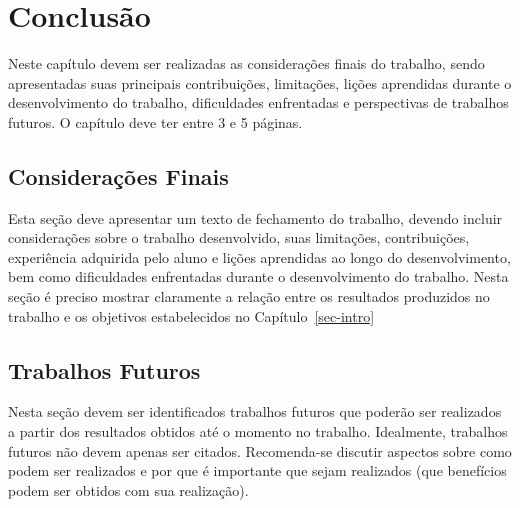 \chapter{Conclusão}
\label{sec-conclusoes}

Neste capítulo devem ser realizadas as considerações finais do trabalho, sendo apresentadas suas principais contribuições, limitações, lições aprendidas durante o desenvolvimento do trabalho, dificuldades enfrentadas e perspectivas de trabalhos futuros. O capítulo deve ter entre 3 e 5 páginas.


\section{Considerações Finais}
\label{sec-conclusoes-consideracoes}

Esta seção deve apresentar um texto de fechamento do trabalho, devendo incluir considerações sobre o trabalho desenvolvido, suas limitações, contribuições, experiência adquirida pelo aluno e lições aprendidas ao longo do desenvolvimento, bem como dificuldades enfrentadas durante o desenvolvimento do trabalho. Nesta seção é preciso mostrar claramente a relação entre os resultados produzidos no trabalho e os objetivos estabelecidos no Capítulo~\ref{sec-intro} 


\section{Trabalhos Futuros}
\label{sec-conclusoes-trabalhosfuturos}

Nesta seção devem ser identificados trabalhos futuros que poderão ser realizados a partir dos resultados obtidos até o momento no trabalho. Idealmente, trabalhos futuros não devem apenas ser citados. Recomenda-se discutir aspectos sobre como podem ser realizados e por que é importante que sejam realizados (que benefícios podem ser obtidos com sua realização).
